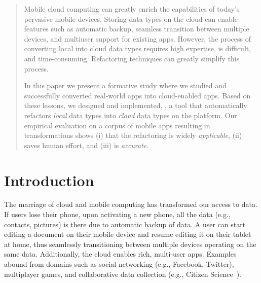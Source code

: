 \documentclass[preprint]{sigplanconf}
\begin{document}
\begin{abstract}
Mobile cloud computing can greatly enrich the capabilities of today's pervasive mobile devices. 
Storing data types on the cloud can enable features such as automatic backup, seamless transition between multiple devices, 
and multiuser support for existing apps. 
However,  the process of converting local into cloud data types requires high expertise, is difficult, and time-consuming. 
Refactoring techniques can greatly simplify this process.
 
In this paper we present a formative study where we studied and successfully converted \numFormative real-world \TD apps into cloud-enabled apps. Based on these lessons, we designed and implemented, \tool, a tool that automatically refactors \emph{local} data types into \emph{cloud} data types on the \TD platform.
Our empirical evaluation on a corpus of \numScripts mobile apps resulting in \numTransformations transformations shows (i) that the refactoring is widely \emph{applicable}, (ii) \tool saves human effort, and (iii) \tool is \emph{accurate}. 

\end{abstract}


\section{Introduction}


The marriage of cloud and mobile computing has transformed our access to data. 
If users lose their phone, upon activating a new phone, all the data (e.g., contacts, pictures) is there due to automatic backup of data.
A user can start editing a document on their mobile device and resume editing it on their tablet at home, thus seamlessly transitioning between multiple devices operating on the same data. Additionally, the cloud enables rich, multi-user apps. Examples abound from domains such as social networking (e.g., Facebook, Twitter), multiplayer games, and collaborative data collection (e.g., Citizen Science~\cite{cohn2008citizen}). 
\end{document}
